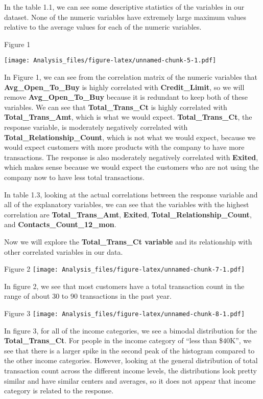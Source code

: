 \documentclass[
]{article}
\begin{document}
In the table 1.1, we can see some descriptive statistics of the
variables in our dataset. None of the numeric variables have extremely
large maximum values relative to the average values for each of the
numeric variables.

Figure 1

\texttt{[image: Analysis\_files/figure-latex/unnamed-chunk-5-1.pdf]}

In Figure 1, we can see from the correlation matrix of the numeric
variables that \textbf{Avg\_Open\_To\_Buy} is highly correlated with
\textbf{Credit\_Limit}, so we will remove \textbf{Avg\_Open\_To\_Buy}
because it is redundant to keep both of these variables. We can see that
\textbf{Total\_Trans\_Ct} is highly correlated with
\textbf{Total\_Trans\_Amt}, which is what we would expect.
\textbf{Total\_Trans\_Ct}, the response variable, is moderately
negatively correlated with \textbf{Total\_Relationship\_Count}, which is
not what we would expect, because we would expect customers with more
products with the company to have more transactions. The response is
also moderately negatively correlated with \textbf{Exited}, which makes
sense because we would expect the customers who are not using the
company now to have less total transactions.

In table 1.3, looking at the actual correlations between the response
variable and all of the explanatory variables, we can see that the
variables with the highest correlation are \textbf{Total\_Trans\_Amt},
\textbf{Exited}, \textbf{Total\_Relationship\_Count}, and
\textbf{Contacts\_Count\_12\_mon}.

Now we will explore the \textbf{Total\_Trans\_Ct variable} and its
relationship with other correlated variables in our data.

Figure 2
\texttt{[image: Analysis\_files/figure-latex/unnamed-chunk-7-1.pdf]}

In figure 2, we see that most customers have a total transaction count
in the range of about 30 to 90 transactions in the past year.

Figure 3
\texttt{[image: Analysis\_files/figure-latex/unnamed-chunk-8-1.pdf]}

In figure 3, for all of the income categories, we see a bimodal
distribution for the \textbf{Total\_Trans\_Ct}. For people in the income
category of ``less than \$40K'', we see that there is a larger spike in
the second peak of the histogram compared to the other income
categories. However, looking at the general distribution of total
transaction count across the different income levels, the distributions
look pretty similar and have similar centers and averages, so it does
not appear that income category is related to the response.
\end{document}
